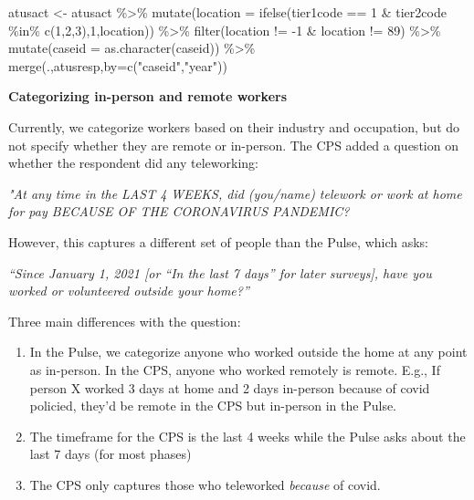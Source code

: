 \documentclass[
]{article}
\newenvironment{Shaded}{\begin{snugshade}}{\end{snugshade}}
\newcommand{\AttributeTok}[1]{\textcolor[rgb]{0.77,0.63,0.00}{#1}}
\newcommand{\DecValTok}[1]{\textcolor[rgb]{0.00,0.00,0.81}{#1}}
\newcommand{\FunctionTok}[1]{\textcolor[rgb]{0.00,0.00,0.00}{#1}}
\newcommand{\NormalTok}[1]{#1}
\newcommand{\OtherTok}[1]{\textcolor[rgb]{0.56,0.35,0.01}{#1}}
\newcommand{\SpecialCharTok}[1]{\textcolor[rgb]{0.00,0.00,0.00}{#1}}
\newcommand{\StringTok}[1]{\textcolor[rgb]{0.31,0.60,0.02}{#1}}
\providecommand{\tightlist}{%
  \setlength{\itemsep}{0pt}\setlength{\parskip}{0pt}}
\begin{document}
\begin{Shaded}
\begin{Highlighting}[]
\NormalTok{atusact }\OtherTok{\textless{}{-}}\NormalTok{ atusact }\SpecialCharTok{\%\textgreater{}\%}
  \FunctionTok{mutate}\NormalTok{(}\AttributeTok{location =} \FunctionTok{ifelse}\NormalTok{(tier1code }\SpecialCharTok{==} \DecValTok{1} \SpecialCharTok{\&}\NormalTok{ tier2code }\SpecialCharTok{\%in\%} \FunctionTok{c}\NormalTok{(}\DecValTok{1}\NormalTok{,}\DecValTok{2}\NormalTok{,}\DecValTok{3}\NormalTok{),}\DecValTok{1}\NormalTok{,location)) }\SpecialCharTok{\%\textgreater{}\%}
  \FunctionTok{filter}\NormalTok{(location }\SpecialCharTok{!=} \SpecialCharTok{{-}}\DecValTok{1} \SpecialCharTok{\&}\NormalTok{ location }\SpecialCharTok{!=} \DecValTok{89}\NormalTok{) }\SpecialCharTok{\%\textgreater{}\%}
  \FunctionTok{mutate}\NormalTok{(}\AttributeTok{caseid =} \FunctionTok{as.character}\NormalTok{(caseid)) }\SpecialCharTok{\%\textgreater{}\%}
  \FunctionTok{merge}\NormalTok{(.,atusresp,}\AttributeTok{by=}\FunctionTok{c}\NormalTok{(}\StringTok{"caseid"}\NormalTok{,}\StringTok{"year"}\NormalTok{))}
\end{Highlighting}
\end{Shaded}

\textbf{Categorizing in-person and remote workers}

Currently, we categorize workers based on their industry and occupation,
but do not specify whether they are remote or in-person. The CPS added a
question on whether the respondent did any teleworking:

\emph{"At any time in the LAST 4 WEEKS, did (you/name) telework or work
at home for pay BECAUSE OF THE CORONAVIRUS PANDEMIC?}

However, this captures a different set of people than the Pulse, which
asks:

\emph{``Since January 1, 2021 {[}or ``In the last 7 days'' for later
surveys{]}, have you worked or volunteered outside your home?''}

Three main differences with the question:

\begin{enumerate}
\def\labelenumi{\arabic{enumi}.}
\tightlist
\item
  In the Pulse, we categorize anyone who worked outside the home at any
  point as in-person. In the CPS, anyone who worked remotely is remote.
  E.g., If person X worked 3 days at home and 2 days in-person because
  of covid policied, they'd be remote in the CPS but in-person in the
  Pulse.
\item
  The timeframe for the CPS is the last 4 weeks while the Pulse asks
  about the last 7 days (for most phases)
\item
  The CPS only captures those who teleworked \emph{because} of covid.
\end{enumerate}
\end{document}
